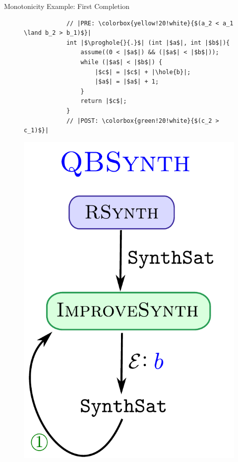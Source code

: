\documentclass[9pt]{beamer}
\newcommand{\hole}[1]{\fbox{\ensuremath{#1}}}
\newcommand{\prog}{\ensuremath{\mathcal{P}}\xspace}
\newcommand{\proghole}[2]{\ensuremath{\prog_{#1}^{[#2]}}}
\begin{document}
\begin{frame}[fragile]{Monotonicity Example: First Completion}
        \begin{figure}[t]
        \begin{minipage}{0.45\columnwidth}
        \begin{verbatim}
            // |PRE: \colorbox{yellow!20!white}{$(a_2 < a_1 \land b_2 > b_1)$}|
            int |$\proghole{}{.}$| (int |$a$|, int |$b$|){
                assume((0 < |$a$|) && (|$a$| < |$b$|));
                while (|$a$| < |$b$|) {
                    |$c$| = |$c$| + |\hole{b}|;
                    |$a$| = |$a$| + 1;
                }
                return |$c$|;
            }
            // |POST: \colorbox{green!20!white}{$(c_2 > c_1)$}|
        \end{verbatim}
        \end{minipage}
        \begin{minipage}{0.45\columnwidth}
            \centering
            \includegraphics[scale=0.3]{assets/stage1.pdf}
        \end{minipage}
    \end{figure}
\end{frame}
\end{document}
